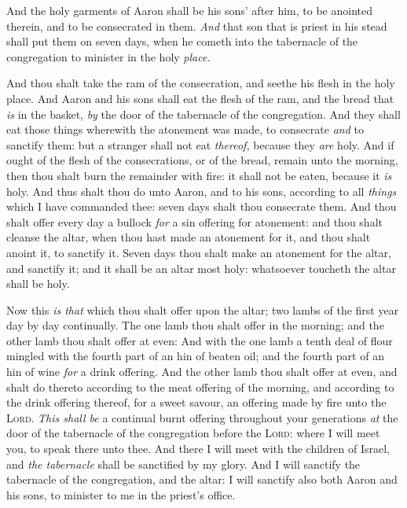 \documentclass[11pt,letterpaper,oneside]{memoir}
\begin{document}
And the holy garments of Aaron shall be his sons' after him, to be
anointed therein, and to be consecrated in them. \emph{And} that son
that is priest in his stead shall put them on seven days, when he cometh
into the tabernacle of the congregation to minister in the holy
\emph{place.}

And thou shalt take the ram of the consecration, and seethe his flesh in
the holy place. And Aaron and his sons shall eat the flesh of the ram,
and the bread that \emph{is} in the basket, \emph{by} the door of the
tabernacle of the congregation. And they shall eat those things
wherewith the atonement was made, to consecrate \emph{and} to sanctify
them: but a stranger shall not eat \emph{thereof,} because they
\emph{are} holy. And if ought of the flesh of the consecrations, or of
the bread, remain unto the morning, then thou shalt burn the remainder
with fire: it shall not be eaten, because it \emph{is} holy. And thus
shalt thou do unto Aaron, and to his sons, according to all
\emph{things} which I have commanded thee: seven days shalt thou
consecrate them. And thou shalt offer every day a bullock \emph{for} a
sin offering for atonement: and thou shalt cleanse the altar, when thou
hast made an atonement for it, and thou shalt anoint it, to sanctify it.
Seven days thou shalt make an atonement for the altar, and sanctify it;
and it shall be an altar most holy: whatsoever toucheth the altar shall
be holy.

Now this \emph{is that} which thou shalt offer upon the altar; two lambs
of the first year day by day continually. The one lamb thou shalt offer
in the morning; and the other lamb thou shalt offer at even: And with
the one lamb a tenth deal of flour mingled with the fourth part of an
hin of beaten oil; and the fourth part of an hin of wine \emph{for} a
drink offering. And the other lamb thou shalt offer at even, and shalt
do thereto according to the meat offering of the morning, and according
to the drink offering thereof, for a sweet savour, an offering made by
fire unto the \textsc{Lord}. \emph{This shall be} a continual burnt
offering throughout your generations \emph{at} the door of the
tabernacle of the congregation before the \textsc{Lord}: where I will
meet you, to speak there unto thee. And there I will meet with the
children of Israel, and \emph{the tabernacle} shall be sanctified by my
glory. And I will sanctify the tabernacle of the congregation, and the
altar: I will sanctify also both Aaron and his sons, to minister to me
in the priest's office.
\end{document}
